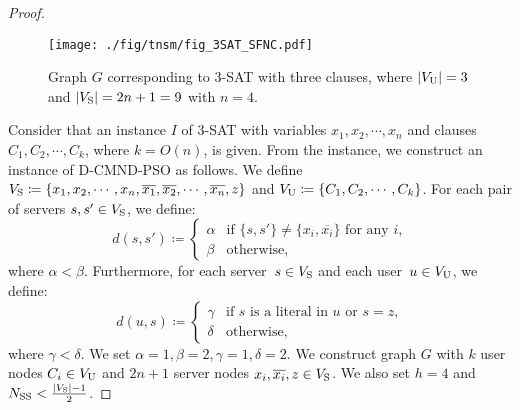\documentclass[10pt, letterpaper]{IEEEtran}
\begin{document}
\begin{CJK}{UTF8}{ipxm}
\begin{proof}
  \begin{figure}[!t]
    \begin{center}
      \texttt{[image: ./fig/tnsm/fig\_3SAT\_SFNC.pdf]}
    \end{center}
    \caption{Graph $G$ corresponding to 3-SAT with three clauses, where $|V_{\rm U}|=3$ and $|V_{\rm S}|=2n+1=9$ with $n=4$.}
    \label{fig:3SAT_SFNC}
  \end{figure}

  Consider that an instance $I$ of 3-SAT with variables $x_1, x_2,\cdots, x_n$ and clauses $C_1, C_2,\cdots, C_k$, where $k=O(n)$, is given.
  From the instance, we construct an instance of D-CMND-PSO as follows.
  We define $V_{\rm{S}} \coloneq \{x_1, x_2,\cdots, x_n, \overline{x_1},\overline{x_2},\cdots,\overline{x_n},z\}$ and $V_{\rm{U}} \coloneq \{C_1,C_2,\cdots,C_k\}$.
  For each pair of servers $s, s'\in V_{\rm{S}}$, we define:
  \begin{equation}
    d(s, s')\coloneqq
    \begin{cases}
      \alpha & \text{if $\{s, s'\}\neq \{x_i,\overline{x_i}\}$ for any $i$,}\\
      \beta& \text{otherwise,}
    \end{cases}
  \end{equation}
  where $\alpha < \beta$. Furthermore, for each server~$s\in V_{\rm{S}}$ and each user~$u\in V_{\rm{U}}$, we define:
  \begin{equation}
    d(u,s)\coloneqq
    \begin{cases}
      \gamma & \text{if $s$ is a literal in $u$ or $s=z$,}\\
      \delta& \text{otherwise,}
    \end{cases}
  \end{equation}
  where $\gamma < \delta$.
  We set $\alpha = 1, \beta = 2, \gamma = 1, \delta = 2$.
  We construct graph $G$ with $k$ user nodes $C_i \in V_{\rm{U}}$ and $2n+1$ server nodes $x_i, \overline{x_i}, z \in V_{\rm{S}}$.
  We also set $h=4$ and $N_{\mathrm{SS}} < \frac{|V_{\rm{S}}|-1}{2}$.


\end{proof}
\end{CJK}
\end{document}
